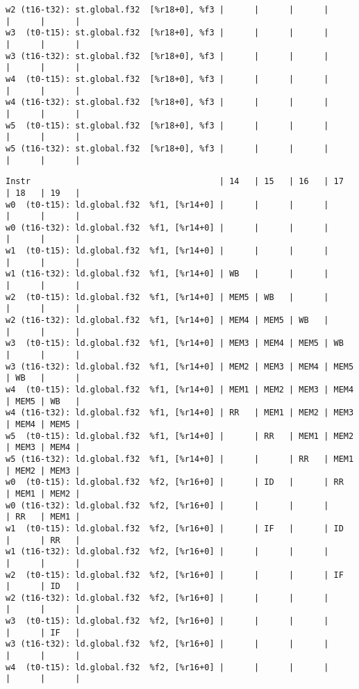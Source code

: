 \documentclass[11pt]{article}
\begin{document}
\begin{Answer}
\begin{verbatim}
w2 (t16-t32): st.global.f32  [%r18+0], %f3 |      |      |      |      |      |      |
w3  (t0-t15): st.global.f32  [%r18+0], %f3 |      |      |      |      |      |      |
w3 (t16-t32): st.global.f32  [%r18+0], %f3 |      |      |      |      |      |      |
w4  (t0-t15): st.global.f32  [%r18+0], %f3 |      |      |      |      |      |      |
w4 (t16-t32): st.global.f32  [%r18+0], %f3 |      |      |      |      |      |      |
w5  (t0-t15): st.global.f32  [%r18+0], %f3 |      |      |      |      |      |      |
w5 (t16-t32): st.global.f32  [%r18+0], %f3 |      |      |      |      |      |      |
\end{verbatim}
	\newpage
	\begin{verbatim}
Instr                                      | 14   | 15   | 16   | 17   | 18   | 19   |
w0  (t0-t15): ld.global.f32  %f1, [%r14+0] |      |      |      |      |      |      |
w0 (t16-t32): ld.global.f32  %f1, [%r14+0] |      |      |      |      |      |      |
w1  (t0-t15): ld.global.f32  %f1, [%r14+0] |      |      |      |      |      |      |
w1 (t16-t32): ld.global.f32  %f1, [%r14+0] | WB   |      |      |      |      |      |
w2  (t0-t15): ld.global.f32  %f1, [%r14+0] | MEM5 | WB   |      |      |      |      |
w2 (t16-t32): ld.global.f32  %f1, [%r14+0] | MEM4 | MEM5 | WB   |      |      |      |
w3  (t0-t15): ld.global.f32  %f1, [%r14+0] | MEM3 | MEM4 | MEM5 | WB   |      |      |
w3 (t16-t32): ld.global.f32  %f1, [%r14+0] | MEM2 | MEM3 | MEM4 | MEM5 | WB   |      |
w4  (t0-t15): ld.global.f32  %f1, [%r14+0] | MEM1 | MEM2 | MEM3 | MEM4 | MEM5 | WB   |
w4 (t16-t32): ld.global.f32  %f1, [%r14+0] | RR   | MEM1 | MEM2 | MEM3 | MEM4 | MEM5 |
w5  (t0-t15): ld.global.f32  %f1, [%r14+0] |      | RR   | MEM1 | MEM2 | MEM3 | MEM4 |
w5 (t16-t32): ld.global.f32  %f1, [%r14+0] |      |      | RR   | MEM1 | MEM2 | MEM3 |
w0  (t0-t15): ld.global.f32  %f2, [%r16+0] |      | ID   |      | RR   | MEM1 | MEM2 |
w0 (t16-t32): ld.global.f32  %f2, [%r16+0] |      |      |      |      | RR   | MEM1 |
w1  (t0-t15): ld.global.f32  %f2, [%r16+0] |      | IF   |      | ID   |      | RR   |
w1 (t16-t32): ld.global.f32  %f2, [%r16+0] |      |      |      |      |      |      |
w2  (t0-t15): ld.global.f32  %f2, [%r16+0] |      |      |      | IF   |      | ID   |
w2 (t16-t32): ld.global.f32  %f2, [%r16+0] |      |      |      |      |      |      |
w3  (t0-t15): ld.global.f32  %f2, [%r16+0] |      |      |      |      |      | IF   |
w3 (t16-t32): ld.global.f32  %f2, [%r16+0] |      |      |      |      |      |      |
w4  (t0-t15): ld.global.f32  %f2, [%r16+0] |      |      |      |      |      |      |

\end{verbatim}
\end{Answer}
\end{document}

